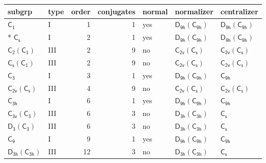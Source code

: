 \documentclass[10pt,a4paper]{article}
\numberwithin{equation}{section}
\newcommand{\grp}[1]{\mathsf{#1}}
\begin{document}
{\small\begin{longtable}{@{}llrrlll@{}}\toprule
subgrp & type & order & conjugates & normal & normalizer & centralizer\\\midrule\endhead
\bottomrule\endfoot\endlastfoot
\href{../../../rotation/data/pdf/C1.pdf}{$\grp{C_{1}}$} & I & 1 & 1 & yes & \href{D9h-C9h.pdf}{$\grp{D_{9h}}(\grp{C_{9h}})$} & \href{D9h-C9h.pdf}{$\grp{D_{9h}}(\grp{C_{9h}})$}\\*
\href{../../../rotation/data/pdf/C1v.pdf}{$\grp{C_{s}}$} & I & 2 & 1 & yes & \href{D9h-C9h.pdf}{$\grp{D_{9h}}(\grp{C_{9h}})$} & \href{D9h-C9h.pdf}{$\grp{D_{9h}}(\grp{C_{9h}})$}\\
\href{C2-C1.pdf}{$\grp{C_{2}}(\grp{C_{1}})$} & III & 2 & 9 & no & \href{C2v-C1v.pdf}{$\grp{C_{2v}}(\grp{C_{s}})$} & \href{C2v-C1v.pdf}{$\grp{C_{2v}}(\grp{C_{s}})$}\\
\href{C1v-C1.pdf}{$\grp{C_{s}}(\grp{C_{1}})$} & III & 2 & 9 & no & \href{C2v-C1v.pdf}{$\grp{C_{2v}}(\grp{C_{s}})$} & \href{C2v-C1v.pdf}{$\grp{C_{2v}}(\grp{C_{s}})$}\\
\href{../../../rotation/data/pdf/C3.pdf}{$\grp{C_{3}}$} & I & 3 & 1 & yes & \href{D9h-C9h.pdf}{$\grp{D_{9h}}(\grp{C_{9h}})$} & \href{../../../rotation/data/pdf/C9h.pdf}{$\grp{C_{9h}}$}\\
\href{C2v-C1v.pdf}{$\grp{C_{2v}}(\grp{C_{s}})$} & III & 4 & 9 & no & \href{C2v-C1v.pdf}{$\grp{C_{2v}}(\grp{C_{s}})$} & \href{C2v-C1v.pdf}{$\grp{C_{2v}}(\grp{C_{s}})$}\\
\href{../../../rotation/data/pdf/C3h.pdf}{$\grp{C_{3h}}$} & I & 6 & 1 & yes & \href{D9h-C9h.pdf}{$\grp{D_{9h}}(\grp{C_{9h}})$} & \href{../../../rotation/data/pdf/C9h.pdf}{$\grp{C_{9h}}$}\\
\href{C3v-C3.pdf}{$\grp{C_{3v}}(\grp{C_{3}})$} & III & 6 & 3 & no & \href{D3h-C3h.pdf}{$\grp{D_{3h}}(\grp{C_{3h}})$} & \href{../../../rotation/data/pdf/C1v.pdf}{$\grp{C_{s}}$}\\
\href{D3-C3.pdf}{$\grp{D_{3}}(\grp{C_{3}})$} & III & 6 & 3 & no & \href{D3h-C3h.pdf}{$\grp{D_{3h}}(\grp{C_{3h}})$} & \href{../../../rotation/data/pdf/C1v.pdf}{$\grp{C_{s}}$}\\
\href{../../../rotation/data/pdf/C9.pdf}{$\grp{C_{9}}$} & I & 9 & 1 & yes & \href{D9h-C9h.pdf}{$\grp{D_{9h}}(\grp{C_{9h}})$} & \href{../../../rotation/data/pdf/C9h.pdf}{$\grp{C_{9h}}$}\\
\href{D3h-C3h.pdf}{$\grp{D_{3h}}(\grp{C_{3h}})$} & III & 12 & 3 & no & \href{D3h-C3h.pdf}{$\grp{D_{3h}}(\grp{C_{3h}})$} & \href{../../../rotation/data/pdf/C1v.pdf}{$\grp{C_{s}}$}\\

\end{longtable}}
\end{document}
